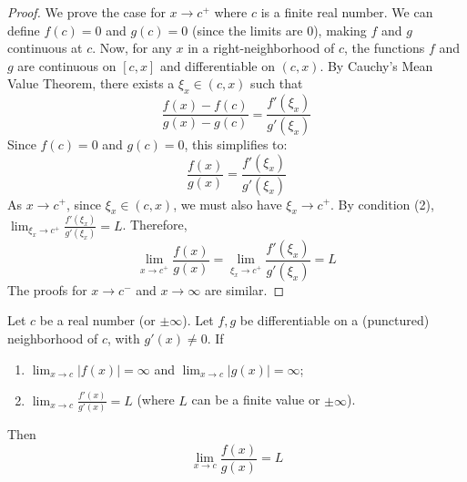 \begin{proof}
We prove the case for $x \to c^+$ where $c$ is a finite real number.
We can define $f(c) = 0$ and $g(c) = 0$ (since the limits are 0), making $f$ and $g$ continuous at $c$.
Now, for any $x$ in a right-neighborhood of $c$, the functions $f$ and $g$ are continuous on $[c, x]$ and differentiable on $(c, x)$.
By Cauchy's Mean Value Theorem, there exists a $\xi_x \in (c, x)$ such that
\[
\frac{f(x) - f(c)}{g(x) - g(c)} = \frac{f'(\xi_x)}{g'(\xi_x)}
\]
Since $f(c)=0$ and $g(c)=0$, this simplifies to:
\[
\frac{f(x)}{g(x)} = \frac{f'(\xi_x)}{g'(\xi_x)}
\]
As $x \to c^+$, since $\xi_x \in (c, x)$, we must also have $\xi_x \to c^+$.
By condition (2), $\lim_{\xi_x \to c^+} \frac{f'(\xi_x)}{g'(\xi_x)} = L$.
Therefore,
\[
\lim_{x \to c^+} \frac{f(x)}{g(x)} = \lim_{\xi_x \to c^+} \frac{f'(\xi_x)}{g'(\xi_x)} = L
\]
The proofs for $x \to c^-$ and $x \to \infty$ are similar.
\end{proof}

\newpage

\begin{theorem}
\label{thm:lhopital_inf_en}
Let $c$ be a real number (or $\pm\infty$). Let $f, g$ be differentiable on a (punctured) neighborhood of $c$, with $g'(x) \neq 0$.
If
\begin{enumerate}
    \item $\lim_{x \to c} |f(x)| = \infty$ and $\lim_{x \to c} |g(x)| = \infty$;
    \item $\lim_{x \to c} \frac{f'(x)}{g'(x)} = L$ (where $L$ can be a finite value or $\pm\infty$).
\end{enumerate}
Then
\[
\lim_{x \to c} \frac{f(x)}{g(x)} = L
\]
\end{theorem}

